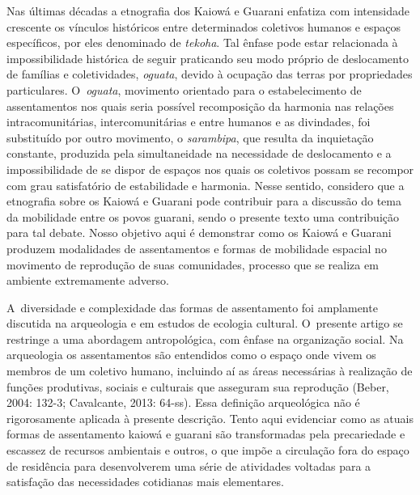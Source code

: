 Nas últimas décadas a etnografia dos Kaiowá e Guarani enfatiza com
intensidade crescente os vínculos históricos entre determinados
coletivos humanos e espaços específicos, por eles denominado de \emph{tekoha}.
Tal ênfase pode estar relacionada à impossibilidade histórica de seguir
praticando seu modo próprio de deslocamento de famílias e
coletividades, \emph{oguata}, devido à ocupação das terras por propriedades
particulares. O~\emph{oguata}, movimento orientado para o estabelecimento de
assentamentos nos quais seria possível recomposição da harmonia nas
relações intracomunitárias, intercomunitárias e entre humanos e as
divindades, foi substituído por outro movimento, o \emph{sarambipa}, que
resulta da inquietação constante, produzida pela simultaneidade na
necessidade de deslocamento e a impossibilidade de se dispor de espaços
nos quais os coletivos possam se recompor com grau satisfatório de
estabilidade e harmonia. Nesse sentido, considero que a etnografia
sobre os Kaiowá e Guarani pode contribuir para a discussão do tema da
mobilidade entre os povos guarani, sendo o presente texto uma
contribuição para tal debate. Nosso objetivo aqui é demonstrar como os
Kaiowá e Guarani produzem modalidades de assentamentos e formas de
mobilidade espacial no movimento de reprodução de suas comunidades,
processo que se realiza em ambiente extremamente adverso.

A~diversidade e complexidade das formas de assentamento foi amplamente
discutida na arqueologia e em estudos de ecologia cultural. O~presente
artigo se restringe a uma abordagem antropológica, com ênfase na
organização social. Na arqueologia os assentamentos são entendidos como
o espaço onde vivem os membros de um coletivo humano, incluindo aí as
áreas necessárias à realização de funções produtivas, sociais e
culturais que asseguram sua reprodução (Beber, 2004: 132-3; 
Cavalcante, 2013: 64-ss). Essa definição
arqueológica não é rigorosamente aplicada à presente descrição. Tento
aqui evidenciar como as atuais formas de assentamento kaiowá e guarani
são transformadas pela precariedade e escassez de recursos ambientais e
outros, o que impõe a circulação fora do espaço de residência para
desenvolverem uma série de atividades voltadas para a satisfação das
necessidades cotidianas mais elementares. 

